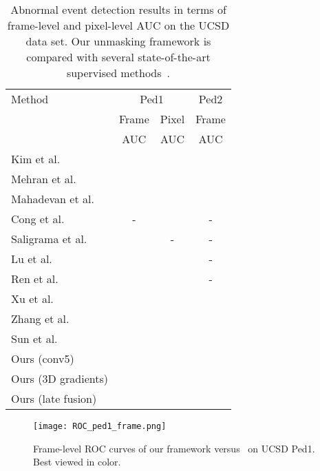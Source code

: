\documentclass[10pt,twocolumn,letterpaper]{article}
\begin{document}
\begin{table}[t]
\small{
\begin{center}
\begin{tabular}{|l|c|c|c|}
\hline
Method 																& \multicolumn{2}{|c|}{Ped1} 			& Ped2\\
\cline{2-4}
			 																& Frame   			& Pixel  				& Frame \\
			 																& AUC   				& AUC  				& AUC \\
\hline
\hline
Kim et al.~\cite{Kim-CVPR-2009}						& 			& 			&  \\
Mehran et al.~\cite{Mehran-CVPR-2009}				& 			& 				&  \\
Mahadevan et al.~\cite{Mahadevan-CVPR-2010}	& 			& 	 		& 	 \\
Cong et al.~\cite{Cong-CVPR-2011}					& -						&  		& - \\
Saligrama et al.~\cite{Saligrama-CVPR-2012}		& 			& -	 					& - \\
Lu et al.~\cite{Lu-ICCV-2013}								& 			& 			& - \\
Ren et al.~\cite{Ren-BMVC-2015}						& 			& 			& - \\
Xu et al.~\cite{Xu-BMVC-2015}							& 			&  		& 	 \\
Zhang et al.~\cite{Zhang-PR-2016}						& 			&  		& 	 \\
Sun et al.~\cite{Sun-PR-2017}							& 			&  		& 	 \\
\hline
Ours (conv5)														& 			&  		& 	 \\
Ours (3D gradients)												& 			&  		& 	 \\
Ours (late fusion)													& 			&  		& 	 \\
\hline
\end{tabular}
\end{center}
}
\vspace*{-0.1cm}
\caption{Abnormal event detection results in terms of frame-level and pixel-level AUC on the UCSD data set. Our unmasking framework is compared with several state-of-the-art supervised methods~\cite{Cong-CVPR-2011,Kim-CVPR-2009,Lu-ICCV-2013,Mahadevan-CVPR-2010,Mehran-CVPR-2009,Ren-BMVC-2015,Saligrama-CVPR-2012,Sun-PR-2017,Xu-BMVC-2015,Zhang-PR-2016}.}
\label{tab_UCSD}
\vspace*{-0.5cm}
\end{table}

\begin{figure}
\vspace*{-0.05cm}
\begin{center}
\texttt{[image: ROC\_ped1\_frame.png]}
\end{center}
\vspace*{-0.2cm}
\caption{Frame-level ROC curves of our framework versus~\cite{Kim-CVPR-2009,Lu-ICCV-2013,Mahadevan-CVPR-2010,Mehran-CVPR-2009,Xu-BMVC-2015,Zhang-PR-2016} on UCSD Ped1. Best viewed in color.}
\label{fig_UCSD_frame_ROC}
\vspace*{-0.1cm}
\end{figure}
\end{document}

